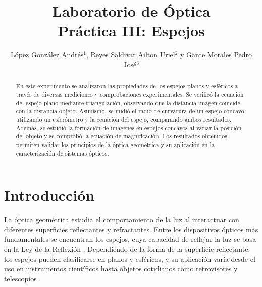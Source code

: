 \documentclass[article,12pt]{elsarticle}
\begin{document}

\begin{frontmatter}
    \title{Laboratorio de Óptica \\  Práctica  III: Espejos}
    \author{López González Andrés$^1$, Reyes Saldivar Ailton Uriel$^2$ y Gante Morales Pedro José$^3$} %
    \address{$^1$ Facultad de Ciencias, Universidad Nacional Autónoma de México, M\'exico CDMX.}

\begin{abstract}

En este experimento se analizaron las propiedades de los espejos planos y esféricos a través de diversas mediciones y comprobaciones experimentales. Se verificó la ecuación del espejo plano mediante triangulación, observando que la distancia imagen coincide con la distancia objeto. Asimismo, se midió el radio de curvatura de un espejo cóncavo utilizando un esferómetro y la ecuación del espejo, comparando ambos resultados. Además, se estudió la formación de imágenes en espejos cóncavos al variar la posición del objeto y se comprobó la ecuación de magnificación. Los resultados obtenidos permiten validar los principios de la óptica geométrica y su aplicación en la caracterización de sistemas ópticos.


\end{abstract}
    
\end{frontmatter}

\vspace{0.5cm} 

\section{Introducción}

La óptica geométrica estudia el comportamiento de la luz al interactuar con diferentes superficies reflectantes y refractantes. Entre los dispositivos ópticos más fundamentales se encuentran los espejos, cuya capacidad de reflejar la luz se basa en la Ley de la Reflexión \cite{Pedrotti2018, Hecht2000}. Dependiendo de la forma de la superficie reflectante, los espejos pueden clasificarse en planos y esféricos, y su aplicación varía desde el uso en instrumentos científicos hasta objetos cotidianos como retrovisores y telescopios \cite{Tipler1999}.
\end{document}
